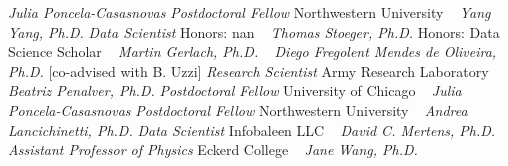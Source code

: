 \GapNoBreak
{}
\textit{Julia Poncela-Casasnovas}
\newline
    \textit{Postdoctoral Fellow}
    \newline
    Northwestern University
    \newline
~
\Gap{}
\textit{Yang Yang, Ph.D.}
\newline
    \textit{Data Scientist}
    \newline
    {\footnotesize Honors: nan}
    \newline
~
\Gap{}
\textit{Thomas Stoeger, Ph.D.}
\newline
    {\footnotesize Honors: Data Science Scholar}
    \newline
~
\Gap{}
\textit{Martin Gerlach, Ph.D.}
\newline
~
\Gap{}
\textit{Diego Fregolent Mendes de Oliveira, Ph.D.}
    [co-advised with B. Uzzi]
\newline
    \textit{Research Scientist}
    \newline
    Army Research Laboratory
    \newline
~
\Gap{}
\textit{Beatriz Penalver, Ph.D.}
\newline
    \textit{Postdoctoral Fellow}
    \newline
    University of Chicago
    \newline
~
\Gap{}
\textit{Julia Poncela-Casasnovas}
\newline
    \textit{Postdoctoral Fellow}
    \newline
    Northwestern University
    \newline
~
\Gap{}
\textit{Andrea Lancichinetti, Ph.D.}
\newline
    \textit{Data Scientist}
    \newline
    Infobaleen LLC
    \newline
~
\Gap{}
\textit{David C. Mertens, Ph.D.}
\newline
    \textit{Assistant Professor of Physics}
    \newline
    Eckerd College
    \newline
~
\Gap{}
\textit{Jane Wang, Ph.D.}
\newline
